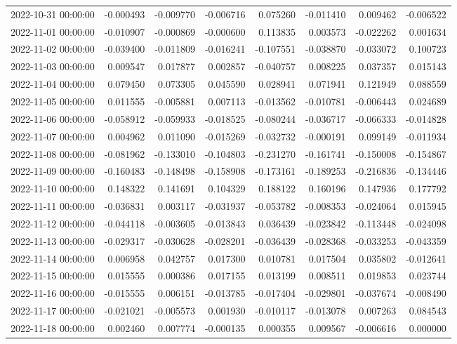 \begin{tabular}{lrrrrrrr}
2022-10-31 00:00:00 & -0.000493 & -0.009770 & -0.006716 & 0.075260 & -0.011410 & 0.009462 & -0.006522 \\
2022-11-01 00:00:00 & -0.010907 & -0.000869 & -0.000600 & 0.113835 & 0.003573 & -0.022262 & 0.001634 \\
2022-11-02 00:00:00 & -0.039400 & -0.011809 & -0.016241 & -0.107551 & -0.038870 & -0.033072 & 0.100723 \\
2022-11-03 00:00:00 & 0.009547 & 0.017877 & 0.002857 & -0.040757 & 0.008225 & 0.037357 & 0.015143 \\
2022-11-04 00:00:00 & 0.079450 & 0.073305 & 0.045590 & 0.028941 & 0.071941 & 0.121949 & 0.088559 \\
2022-11-05 00:00:00 & 0.011555 & -0.005881 & 0.007113 & -0.013562 & -0.010781 & -0.006443 & 0.024689 \\
2022-11-06 00:00:00 & -0.058912 & -0.059933 & -0.018525 & -0.080244 & -0.036717 & -0.066333 & -0.014828 \\
2022-11-07 00:00:00 & 0.004962 & 0.011090 & -0.015269 & -0.032732 & -0.000191 & 0.099149 & -0.011934 \\
2022-11-08 00:00:00 & -0.081962 & -0.133010 & -0.104803 & -0.231270 & -0.161741 & -0.150008 & -0.154867 \\
2022-11-09 00:00:00 & -0.160483 & -0.148498 & -0.158908 & -0.173161 & -0.189253 & -0.216836 & -0.134446 \\
2022-11-10 00:00:00 & 0.148322 & 0.141691 & 0.104329 & 0.188122 & 0.160196 & 0.147936 & 0.177792 \\
2022-11-11 00:00:00 & -0.036831 & 0.003117 & -0.031937 & -0.053782 & -0.008353 & -0.024064 & 0.015945 \\
2022-11-12 00:00:00 & -0.044118 & -0.003605 & -0.013843 & 0.036439 & -0.023842 & -0.113448 & -0.024098 \\
2022-11-13 00:00:00 & -0.029317 & -0.030628 & -0.028201 & -0.036439 & -0.028368 & -0.033253 & -0.043359 \\
2022-11-14 00:00:00 & 0.006958 & 0.042757 & 0.017300 & 0.010781 & 0.017504 & 0.035802 & -0.012641 \\
2022-11-15 00:00:00 & 0.015555 & 0.000386 & 0.017155 & 0.013199 & 0.008511 & 0.019853 & 0.023744 \\
2022-11-16 00:00:00 & -0.015555 & 0.006151 & -0.013785 & -0.017404 & -0.029801 & -0.037674 & -0.008490 \\
2022-11-17 00:00:00 & -0.021021 & -0.005573 & 0.001930 & -0.010117 & -0.013078 & 0.007263 & 0.084543 \\
2022-11-18 00:00:00 & 0.002460 & 0.007774 & -0.000135 & 0.000355 & 0.009567 & -0.006616 & 0.000000 \\

\end{tabular}
